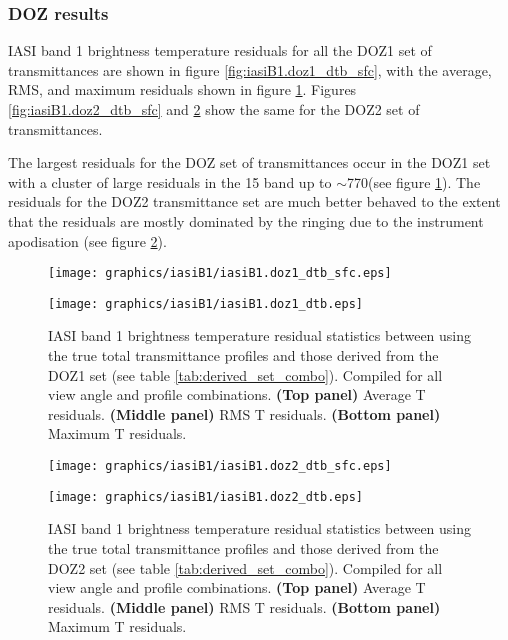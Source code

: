 \subsubsection{DOZ results}
IASI band 1 brightness temperature residuals for all the DOZ1 set of transmittances are shown in figure \ref{fig:iasiB1.doz1_dtb_sfc}, with the average, RMS, and maximum residuals shown in figure \ref{fig:iasiB1.doz1_dtb}. Figures \ref{fig:iasiB1.doz2_dtb_sfc} and \ref{fig:iasiB1.doz2_dtb} show the same for the DOZ2 set of transmittances.

The largest residuals for the DOZ set of transmittances occur in the DOZ1 set with a cluster of large residuals in the \carbondioxide{} 15\micron{} band up to $\sim$770\invcm (see figure \ref{fig:iasiB1.doz1_dtb}). The residuals for the DOZ2 transmittance set are much better behaved to the extent that the residuals are mostly dominated by the ringing due to the instrument apodisation (see figure \ref{fig:iasiB1.doz2_dtb}).
\begin{figure}[htp]
  \centering
  \texttt{[image: graphics/iasiB1/iasiB1.doz1\_dtb\_sfc.eps]}
  \caption{IASI band 1 brightness temperature residuals for all view angles and profiles between using the true total transmittance profiles and those derived from the DOZ1 set (see table \ref{tab:derived_set_combo})}
  \label{fig:iasiB1.doz1_dtb_sfc}
  \vspace{1em}
  \texttt{[image: graphics/iasiB1/iasiB1.doz1\_dtb.eps]}
  \caption{IASI band 1 brightness temperature residual statistics between using the true total transmittance profiles and those derived from the DOZ1 set (see table \ref{tab:derived_set_combo}). Compiled for all view angle and profile combinations. \textbf{(Top panel)} Average T residuals. \textbf{(Middle panel)} RMS T residuals. \textbf{(Bottom panel)} Maximum T residuals.}
  \label{fig:iasiB1.doz1_dtb}
\end{figure}
\begin{figure}[htp]
  \centering
  \texttt{[image: graphics/iasiB1/iasiB1.doz2\_dtb\_sfc.eps]}
  \caption{IASI band 1 brightness temperature residuals for all view angles and profiles between using the true total transmittance profiles and those derived from the DOZ2 set (see table \ref{tab:derived_set_combo})}
  \label{fig:iasiB1.doz2_dtb_sfc}
  \vspace{1em}
  \texttt{[image: graphics/iasiB1/iasiB1.doz2\_dtb.eps]}
  \caption{IASI band 1 brightness temperature residual statistics between using the true total transmittance profiles and those derived from the DOZ2 set (see table \ref{tab:derived_set_combo}). Compiled for all view angle and profile combinations. \textbf{(Top panel)} Average T residuals. \textbf{(Middle panel)} RMS T residuals. \textbf{(Bottom panel)} Maximum T residuals.}
  \label{fig:iasiB1.doz2_dtb}
\end{figure}


